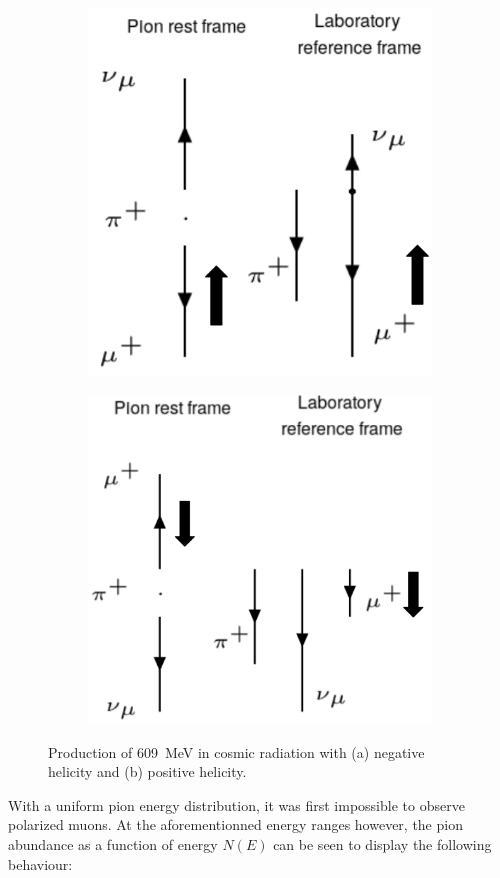 \begin{figure}[htbp]
  \centering
   \begin{subfigure}[t]{0.49\linewidth}
  \centering
   \includegraphics[width=0.7\linewidth]{./fig/spindecaa.png}
  \caption{}
\label{sfig:spindeca}
  \end{subfigure}
 \begin{subfigure}[t]{0.49\linewidth}
  \centering
   \includegraphics[width=0.7\linewidth]{./fig/spindecbb.png}
  \caption{}
  \label{sfig:spindecb}
  \end{subfigure}
  \caption{Production of \SI{609}{\mega\electronvolt} in cosmic radiation with (a) negative helicity and (b) positive helicity.}%
  \label{fig:spindec}
\end{figure}

With a uniform pion energy distribution, it was first impossible to observe polarized muons. At the aforementionned energy ranges however, the pion abundance as a function of energy $N(E)$ can be seen to display the following behaviour:

